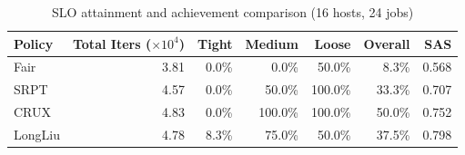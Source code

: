 \begin{table}[t]
\centering
\caption{SLO attainment and achievement comparison (16 hosts, 24 jobs)}
\label{tab:slo_16host}
\begin{tabular}{l|r|r|r|r|r|r}
\hline
Policy & Total Iters ($\times 10^4$) & Tight & Medium & Loose & Overall & SAS \\
\hline
Fair & 3.81 & 0.0\% & 0.0\% & 50.0\% & 8.3\% & 0.568 \\
SRPT & 4.57 & 0.0\% & 50.0\% & 100.0\% & 33.3\% & 0.707 \\
CRUX & 4.83 & 0.0\% & 100.0\% & 100.0\% & 50.0\% & 0.752 \\
LongLiu & 4.78 & 8.3\% & 75.0\% & 50.0\% & 37.5\% & 0.798 \\
\hline
\end{tabular}
\end{table}
